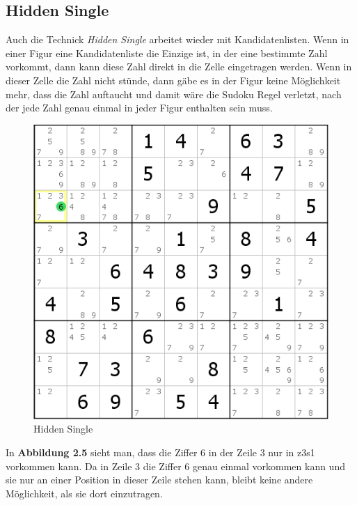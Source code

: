 \newpage
\subsection{Hidden Single}
\label{Hidden Single}
Auch die Technick \textit{Hidden Single} arbeitet wieder mit Kandidatenlisten. Wenn in einer Figur eine Kandidatenliste die Einzige ist, in der eine bestimmte Zahl vorkommt, dann kann diese Zahl direkt in die Zelle eingetragen werden. Wenn in dieser Zelle die Zahl nicht stünde, dann gäbe es in der Figur keine Möglichkeit mehr, dass die Zahl auftaucht und damit wäre die Sudoku Regel verletzt, nach der jede Zahl genau einmal in jeder Figur enthalten sein muss.

\begin{figure}[h]
\begin{center}
\includegraphics{./img/hidden_single.png}
\caption{Hidden Single}
\end{center}
\end{figure}

\noindent In \textbf{Abbildung 2.5} sieht man, dass die Ziffer 6 in der Zeile 3 nur in z3s1 vorkommen kann. Da in Zeile 3 die Ziffer 6 genau einmal vorkommen kann und sie nur an einer Position in dieser Zeile stehen kann, bleibt keine andere Möglichkeit, als sie dort einzutragen.
